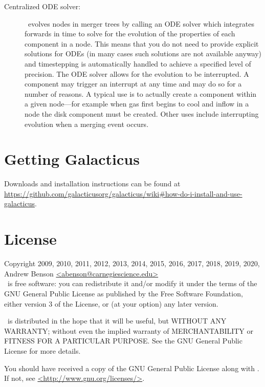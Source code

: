 \begin{description}
 \item [Centralized ODE solver:] \glc\ evolves nodes in merger trees by calling an ODE solver which integrates forwards in time to solve for the evolution of the properties of each component in a node. This means that you do not need to provide explicit solutions for ODEs (in many cases such solutions are not available anyway) and timestepping is automatically handled to achieve a specified level of precision. The ODE solver allows for the evolution to be interrupted. A component may trigger an interrupt at any time and may do so for a number of reasons. A typical use is to actually create a component within a given node---for example when gas first begins to cool and inflow in a node the disk component must be created. Other uses include interrupting evolution when a merging event occurs.
\end{description}

\section{Getting Galacticus}

Downloads and installation instructions can be found at \href{https://github.com/galacticusorg/galacticus/wiki#how-do-i-install-and-use-galacticus}{\normalfont \ttfamily https://github.com/galacticusorg/galacticus/wiki\#how-do-i-install-and-use-galacticus}.

\section{License}

Copyright 2009, 2010, 2011, 2012, 2013, 2014, 2015, 2016, 2017, 2018, 2019, 2020, Andrew Benson \href{mailto:abenson@carnegiescience.edu}{\normalfont \ttfamily <abenson@carnegiescience.edu>}\\

\glc\ is free software: you can redistribute it and/or modify
it under the terms of the GNU General Public License as published by
the Free Software Foundation, either version 3 of the License, or
(at your option) any later version.

\glc\ is distributed in the hope that it will be useful,
but WITHOUT ANY WARRANTY; without even the implied warranty of
MERCHANTABILITY or FITNESS FOR A PARTICULAR PURPOSE.  See the
GNU General Public License for more details.

You should have received a copy of the GNU General Public License
along with \glc.  If not, see \href{http://www.gnu.org/licenses/}{\normalfont \ttfamily <http://www.gnu.org/licenses/>}.
